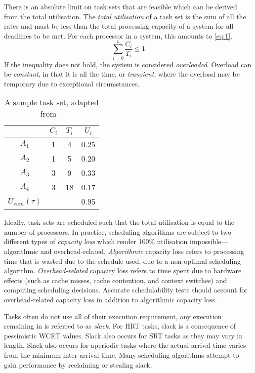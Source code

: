 There is an absolute limit on task sets that are feasible which can be derived from the total
utilisation. 
The \emph{total utilisation} of a task set is the sum of all the rates and must be less than the
total processing capacity of a system for all deadlines to be met.
For each processor in a system, this amounts to \cref{eq:1}.
\begin{equation}
    \label{eq:1}
	\sum\limits_{i=0}^n \dfrac{C_{i}}{T_{i}} \leq 1
\end{equation}
If the inequality does not hold, the system is considered \emph{overloaded}. Overload
can be \emph{constant}, in that it is all the time, or \emph{transient}, where the overload may be
temporary due to exceptional circumstances.

\begin{table}
    \centering
    \begin{tabular}{cccc} \toprule
        & \emph{$C_{i}$} & $T_{i}$ & $U_{i} $ \\ \midrule
			$ A_{1}$ & 1 & 4 & 0.25 \\
			$ A_{2}$ & 1 & 5 & 0.20 \\
			$ A_{3}$ & 3 & 9 & 0.33 \\
			$ A_{4}$ & 3 & 18 & 0.17  \\\midrule 
	$ U_{sum}(\tau)$ & &  & 0.95 \\ \bottomrule
	\end{tabular}
	\caption{A sample task set, adapted from ~\citep{Brandenburg:phd}}
	\label{tab:example_task_set}
\end{table}

Ideally, task sets are scheduled such that the total utilisation is equal to the number of
processors.  In practice, scheduling algorithms are subject to two different types of \emph{capacity
loss} which render 100\% utilisation impossible---algorithmic and overhead-related.
\emph{Algorithmic} capacity loss refers to processing time that is wasted due to the schedule used,
due to a non-optimal scheduling algorithm.  \emph{Overhead-related} capacity loss refers to time
spent due to hardware effects (such as cache misses, cache contention, and context switches) and
computing scheduling decisions.  Accurate schedulability tests should account for overhead-related
capacity loss in addition to algorithmic capacity loss.

Tasks often do not use all of their execution requirement, any execution remaining in is referred to
as \emph{slack}. For \gls{HRT} tasks, slack is a consequence of pessimistic \gls{WCET} values. Slack
also occurs for \gls{SRT} tasks as they may vary in length. Slack also occurs for aperiodic
tasks where the actual arrival time varies from the minimum inter-arrival time. Many scheduling algorithms
attempt to gain performance by reclaiming or stealing slack.


